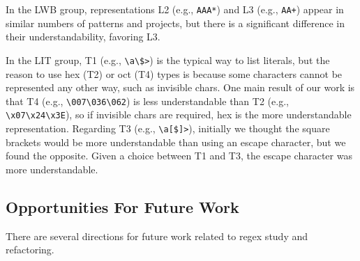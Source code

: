 In the LWB group,  representations L2 (e.g., \verb!AAA*!) and L3 (e.g., \verb!AA+!) appear in similar numbers of patterns and projects, but there is a significant difference in their understandability, favoring L3.


In the LIT group, T1 (e.g., \verb!\a\$>!) is the typical way to list literals, but the reason to use hex (T2) or oct (T4) types is because some characters cannot be represented any other way, such as invisible chars.  One main result of our work is that  T4 (e.g., \verb!\007\036\062!) is  less understandable   than T2 (e.g., \verb!\x07\x24\x3E!), so if invisible chars are required, hex is the more understandable representation.
Regarding T3 (e.g., \verb!\a[$]>!), initially we thought the square brackets would be more understandable than using an escape character,  but we found the opposite. Given a choice between T1 and T3, the escape character was more understandable.

\subsection{Opportunities For Future Work}
There are several directions for future work related to regex study and refactoring.


